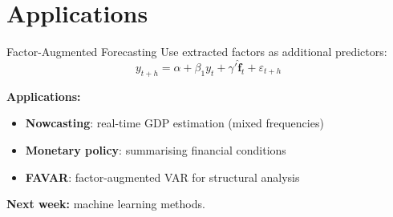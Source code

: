 \documentclass[aspectratio=169, 10pt]{beamer}
\begin{document}
\section{Applications}

\begin{frame}{Factor-Augmented Forecasting}
Use extracted factors as additional predictors:
\[
y_{t+h} = \alpha + \beta_1 y_t + \gamma' \hat{\mathbf{f}}_t + \varepsilon_{t+h}
\]

\textbf{Applications:}
\begin{itemize}
    \item \textbf{Nowcasting}: real-time GDP estimation (mixed frequencies)
    \item \textbf{Monetary policy}: summarising financial conditions
    \item \textbf{FAVAR}: factor-augmented VAR for structural analysis
\end{itemize}

\vspace{0.5em}
\textbf{Next week:} machine learning methods.
\end{frame}
\end{document}
